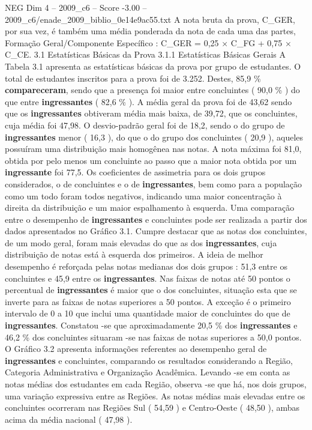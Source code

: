 \begin{textsample}{NEG Dim 4 – 2009\_c6 – Score -3.00 – 2009\_c6/enade\_2009\_biblio\_0e14e9ac55.txt}
A nota bruta da prova, C\_GER, por sua vez, é também uma média ponderada da nota de cada uma das partes, Formação Geral/Componente Específico : C\_GER = 0,25 × C\_FG + 0,75 × C\_CE. 3.1 Estatísticas Básicas da Prova 3.1.1 Estatísticas Básicas Gerais A Tabela 3.1 apresenta as estatísticas básicas da prova por grupo de estudantes.
O total de estudantes inscritos para a prova foi de 3.252.
Destes, 85,9 \% \textbf{compareceram}, sendo que a presença foi maior entre concluintes ( 90,0 \% ) do que entre \textbf{ingressantes} ( 82,6 \% ).
A média geral da prova foi de 43,62 sendo que os \textbf{ingressantes} obtiveram média mais baixa, de 39,72, que os concluintes, cuja média foi 47,98.
O desvio-padrão geral foi de 18,2, sendo o do grupo de \textbf{ingressantes} menor ( 16,3 ), do que o do grupo dos concluintes ( 20,9 ), aqueles possuíram uma distribuição mais homogênea nas notas.
A nota máxima foi 81,0, obtida por pelo menos um concluinte ao passo que a maior nota obtida por um \textbf{ingressante} foi 77,5.
Os coeficientes de assimetria para os dois grupos considerados, o de concluintes e o de \textbf{ingressantes}, bem como para a população como um todo foram todos negativos, indicando uma maior concentração à direita da distribuição e um maior espalhamento à esquerda.
Uma comparação entre o desempenho de \textbf{ingressantes} e concluintes pode ser realizada a partir dos dados apresentados no Gráfico 3.1.
Cumpre destacar que as notas dos concluintes, de um modo geral, foram mais elevadas do que as dos \textbf{ingressantes}, cuja distribuição de notas está à esquerda dos primeiros.
A ideia de melhor desempenho é reforçada pelas notas medianas dos dois grupos : 51,3 entre os concluintes e 45,9 entre os \textbf{ingressantes}.
Nas faixas de notas até 50 pontos o percentual de \textbf{ingressantes} é maior que o dos concluintes, situação esta que se inverte para as faixas de notas superiores a 50 pontos.
A exceção é o primeiro intervalo de 0 a 10 que inclui uma quantidade maior de concluintes do que de \textbf{ingressantes}.
Constatou -se que aproximadamente 20,5 \% dos \textbf{ingressantes} e 46,2 \% dos concluintes situaram -se nas faixas de notas superiores a 50,0 pontos.
O Gráfico 3.2 apresenta informações referentes ao desempenho geral de \textbf{ingressantes} e concluintes, comparando os resultados considerando a Região, Categoria Administrativa e Organização Acadêmica.
Levando -se em conta as notas médias dos estudantes em cada Região, observa -se que há, nos dois grupos, uma variação expressiva entre as Regiões.
As notas médias mais elevadas entre os concluintes ocorreram nas Regiões Sul ( 54,59 ) e Centro-Oeste ( 48,50 ), ambas acima da média nacional ( 47,98 ).

\end{textsample}
